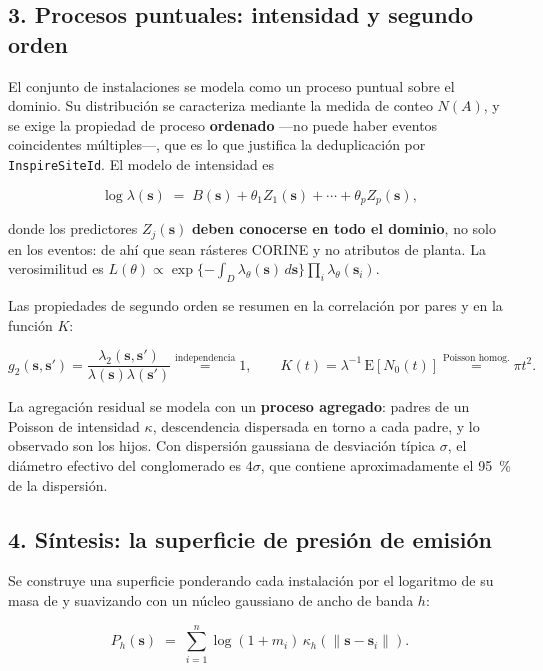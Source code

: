\documentclass[11pt,a4paper]{article}
\newcommand{\dom}{D}
\newcommand{\loc}{\bm{s}}
\newcommand{\loci}[1]{\bm{s}_{#1}}
\newcommand{\Esp}{\mathrm{E}}
\begin{document}
\subsection*{3. Procesos puntuales: intensidad y segundo orden}

El conjunto de instalaciones se modela como un proceso puntual sobre el
dominio. Su distribución se caracteriza mediante la medida de conteo $N(A)$, y
se exige la propiedad de proceso \textbf{ordenado} —no puede haber eventos
coincidentes múltiples—, que es lo que justifica la deduplicación por
\texttt{InspireSiteId}. El modelo de intensidad es

\begin{equation}
\log \lambda(\loc) \;=\; B(\loc) + \theta_1 Z_1(\loc) + \cdots +
\theta_p Z_p(\loc),
\end{equation}

donde los predictores $Z_j(\loc)$ \textbf{deben conocerse en todo el dominio},
no solo en los eventos: de ahí que sean rásteres CORINE y no atributos de
planta. La verosimilitud es
$L(\theta)\propto \exp\{-\int_\dom \lambda_\theta(\loc)\,d\loc\}
\prod_i \lambda_\theta(\loci{i})$.

Las propiedades de segundo orden se resumen en la correlación por pares y en la
función $K$:

\begin{equation}
g_2(\loc,\loc') = \frac{\lambda_2(\loc,\loc')}{\lambda(\loc)\lambda(\loc')}
\overset{\text{independencia}}{=} 1,
\qquad
K(t) = \lambda^{-1}\,\Esp[N_0(t)]
\overset{\text{Poisson homog.}}{=} \pi t^2 .
\end{equation}

La agregación residual se modela con un \textbf{proceso agregado}: padres de un
Poisson de intensidad $\kappa$, descendencia dispersada en torno a cada padre,
y lo observado son los hijos. Con dispersión gaussiana de desviación típica
$\sigma$, el diámetro efectivo del conglomerado es $4\sigma$, que contiene
aproximadamente el \SI{95}{\percent} de la dispersión.

\subsection*{4. Síntesis: la superficie de presión de emisión}

Se construye una superficie ponderando cada instalación por el logaritmo de su
masa de  y suavizando con un núcleo gaussiano de ancho de banda $h$:

\begin{equation}
P_h(\loc) \;=\; \sum_{i=1}^{n} \log(1+m_i)\,
\kappa_h\!\left(\lVert\loc-\loci{i}\rVert\right).
\end{equation}
\end{document}
